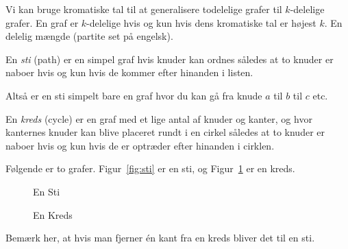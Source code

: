 Vi kan bruge kromatiske tal til at generalisere todelelige grafer til $k$-delelige grafer. En graf er $k$-delelige hvis og kun hvis dens kromatiske tal er højest $k$. En delelig mængde (partite set på engelsk).

\begin{definition}[Sti]
En \textit{sti} (path) er en simpel graf hvis knuder kan ordnes således at to knuder er naboer hvis og kun hvis de kommer efter hinanden i listen.
\end{definition}

Altså er en sti simpelt bare en graf hvor du kan gå fra knude $a$ til $b$ til $c$ etc.

\begin{definition}[Kreds]
En \textit{kreds} (cycle) er en graf med et lige antal af knuder og kanter, og hvor kanternes knuder kan blive placeret rundt i en cirkel således at to knuder er naboer hvis og kun hvis de er optræder efter hinanden i cirklen.
\end{definition}

\begin{example}
Følgende er to grafer. Figur~\ref{fig:sti} er en sti, og Figur~\ref{fig:kreds} er en kreds.

\begin{figure}[H]
  \centering
  \begin{minipage}{0.45\textwidth}
    \centering
    \caption{\label{fig:sti} En Sti}
  \end{minipage}
  \hfill
  \begin{minipage}{0.45\textwidth}
    \centering
    \caption{\label{fig:kreds} En Kreds}
  \end{minipage}
\end{figure}
Bemærk her, at hvis man fjerner én kant fra en kreds bliver det til en sti.
\end{example}


